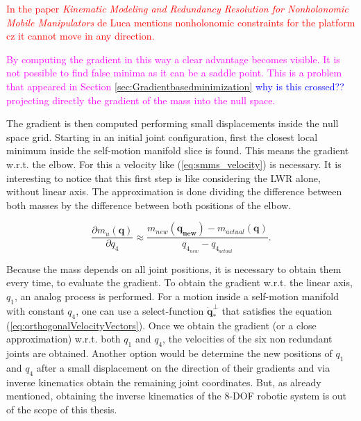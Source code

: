 \textcolor{red}{In the paper \textit{Kinematic Modeling and Redundancy Resolution for Nonholonomic Mobile Manipulators} de Luca  mentions nonholonomic constraints for the platform cz it cannot move in any direction. }






\textcolor{magenta}{By computing the gradient in this way a clear advantage becomes visible. It is not possible to find false minima as it can be a saddle point. This is a problem that appeared in Section \ref{sec:Gradientbasedminimization} \textcolor{blue}{why is this crossed?? } projecting directly the gradient of the mass into the null space.}


The gradient is then computed performing small displacements inside the null space grid. Starting in an initial joint configuration, first the closest local minimum inside the self-motion manifold slice is found. This means the gradient w.r.t. the elbow. For this a velocity like (\ref{eq:smms_velocity}) is necessary. It is interesting to notice that this first step is like considering the LWR alone, without linear axis. The approximation is done dividing the difference between both  masses by the difference between both positions of the elbow. 



\begin{equation}
\frac{\partial {m_u(\mathbf{q})}}{\partial {q_4}} \approx \frac{m_{new}(\mathbf{q_{new}}) - m_{actual}(\mathbf{q})}{ q_{4_{new}} - q_{4_{actual}}}.
\label{eq:approx_grad_q4}
\end{equation}



Because the mass depends on all joint positions, it is necessary to obtain them every time, to evaluate the gradient. To obtain the gradient w.r.t. the linear axis, $q_1$, an analog process is performed. For a motion inside a self-motion manifold with constant $q_4$, one can use a select-function $\dot{\mathbf{q}}_*^{\bot}$ that satisfies the equation (\ref{eq:orthogonalVelocityVectors}).
Once we obtain the gradient (or a close approximation) w.r.t. both $q_1$ and $q_4$, the velocities of the six non redundant joints are obtained. 
Another option would be determine the new positions of $q_1$ and $q_4$ after a small displacement on the direction of their gradients and via inverse kinematics obtain the remaining joint coordinates. But, as already mentioned, obtaining the inverse kinematics of the 8-DOF robotic system is out of the scope of this thesis.



